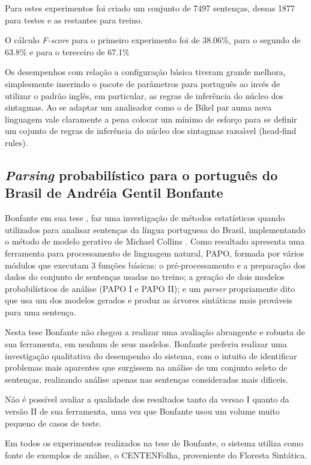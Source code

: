 Para estes experimentos foi criado um conjunto de 7497 sentenças, dessas 1877 para testes e as restantes para treino.

O cálculo \emph{F-score} para o primeiro experimento foi de 38.06{\%}, para o segundo de 63.8{\%} e para o tereceiro de 67.1{\%} 

Os desempenhos com relação a configuração básica tiveram grande melhora, simplesmente inserindo o pacote de parâmetros para português ao invés de utilizar o padrão inglês, em particular, as regras de inferência do núcleo dos sintagmas. Ao se adaptar um analisador como o de Bikel par auma nova linguagem vale claramente a pena colocar um mínimo de esforço para se definir um cojunto de regras de inferência do núcleo dos sintagmas razoável (head-find rules).

\subsection{\emph{Parsing} probabilístico para o português do Brasil de Andréia Gentil Bonfante} %
\label{sec:bonfante}

Bonfante em sua tese \cite{bonfante03}, faz uma investigação de métodos estatísticos quando utilizados para analisar sentenças da língua portuguesa do Brasil, implementando o método de modelo gerativo de Michael Collins \cite{collins99}. Como resultado apresenta uma ferramenta para processamento de linguagem natural, PAPO, formada por vários módulos que executam 3 funções básicas: o pré-processamento e a preparação dos dados do conjunto de sentenças usadas no treino; a geração de dois modelos probabilísticos de análise (PAPO I e PAPO II); e um \emph{parser} propriamente dito que usa um dos modelos gerados e produz as árvores sintáticas mais prováveis para uma sentença.

Nesta tese Bonfante não chegou a realizar uma avaliação abrangente e robusta de sua ferramenta, em nenhum de seus modelos. Bonfante preferiu realizar uma investigação qualitativa do desempenho do sistema, com o intuito de identificar problemas mais aparentes que surgissem na análise de um conjunto seleto de sentenças, realizando análise apenas nas sentenças consideradas mais dificeis.

Não é possível avaliar a qualidade dos resultados tanto da versao I quanto da versão II de sua ferramenta, uma vez que Bonfante usou um volume muito pequeno de casos de teste.

Em todos os experimentos realizados na tese de Bonfante, o sistema utiliza como fonte de exemplos de análise, o CENTENFolha, proveniente do Floresta Sintática.

